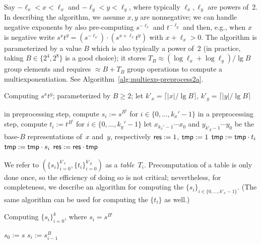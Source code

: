 \documentclass[11pt]{article}
\def\tmp{{\sf tmp}}
\def\res{{\sf res}}
\newcommand{\jnote}[1]{{\textcolor{blue}{Jon's note: #1}}}
\newcommand{\?}[1]{\stackrel{?}{#1}}
\begin{document}
Say $-\ell_x < x < \ell_x$ and $-\ell_y < y < \ell_y$, where typically $\ell_x, \ell_y$ are powers of~2.
In describing the algorithm, we assume $x, y$ are nonnegative; 
we can handle negative exponents by also
pre-computing $s^{-\ell_x}$ and $t^{-\ell_y}$ and then, e.g., when $x$ is negative write $s^xt^y = \left(s^{-\ell_x}\right) \cdot \left(s^{x+\ell_x}t^y\right)$ with \mbox{$x+\ell_x> 0$}.
The algorithm is parameterized by a value $B$ which is also typically a power of~2 (in practice, taking $B\in\{2^4,2^8\}$ is a good choice); it stores $T_B \approx (\log \ell_x + \log \ell_y)/\lg B$ group elements and requires 
$\approx B+T_B$ group operations to compute a multiexponentiation.
See Algorithm~\ref{alg:multiexp-preprocess2a}.

\begin{algorithm}
\caption{Computing $s^xt^y$; parameterized by $B\geq 2$; let $k'_x=\lceil |x|/\lg B\rceil$, $k'_y=\lceil |y|/\lg B\rceil$}\label{alg:multiexp-preprocess2a}
\begin{algorithmic}[1]
\State in preprocessing step, compute $s_{i} := s^{B^i}$ for $i\in \{0, \ldots, k_x'-1\}$ 
\State in a preprocessing step, compute $t_i := t^{B^i}$ for $i\in \{0, \ldots, k_y'-1\}$
\State let $x_{k_x'-1} \cdots x_0$ and $y_{k'_y-1}\cdots y_0$ be the base-$B$ representations of~$x$ and~$y$, respectively
\State $\res := 1$, $\tmp:=1$
    \State $\tmp:= \tmp \cdot t_i$
   \EndFor
    \State $\tmp:= \tmp \cdot s_i$
   \EndFor
   \State $\res:=\res\cdot \tmp$
\EndFor
\State \Return \res
\end{algorithmic}
\end{algorithm}


We refer to $(\{s_i\}_{i=0}^{k'_x}, \{t_i\}_{i=0}^{k'_y})$ as a \emph{table}~$T_i$.
Precomputation of a table is only done once, so the efficiency of doing so is not critical; nevertheless, 
for completeness, we describe an algorithm for computing the $\{s_i\}_{i \in \{0, \ldots, k'_x-1\}}$. (The same algorithm can be used for computing the $\{t_i\}$ as well.)

\begin{algorithm}
\caption{Computing $\{s_i\}_{i=0}^k$, where $s_i = s^{B^i}$}
\begin{algorithmic}[1]
\State $s_0:=s$
    \State $s_i:=s_{i-1}^B$
\EndFor
\end{algorithmic}
\end{algorithm}
\end{document}
